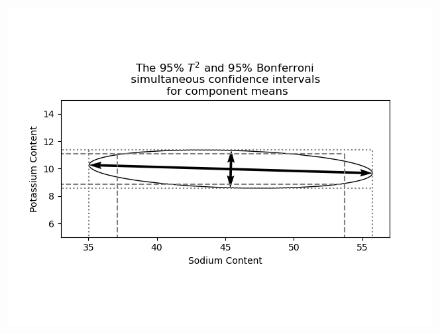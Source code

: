 \begin{figure}[H]
    \centering
    \includegraphics[scale=0.75]{./python/chapter-5/Question-5-7-CI-Sodium-Potassium.png}
\end{figure}


